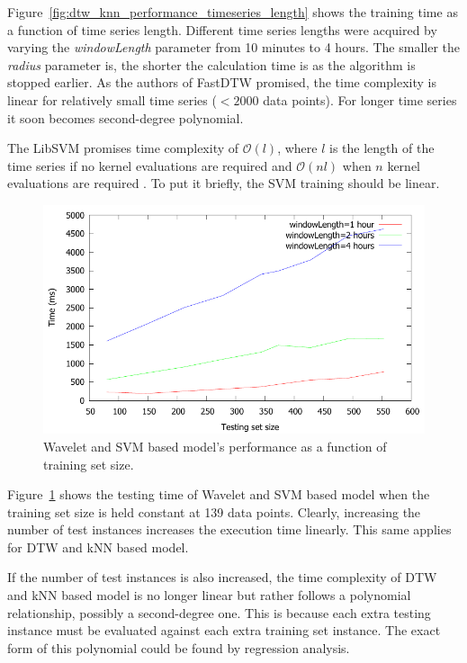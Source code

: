 Figure~\ref{fig:dtw_knn_performance_timeseries_length} shows the training time as a function of time series length. Different time series lengths were acquired by varying the \emph{windowLength} parameter from 10 minutes to 4 hours. The smaller the \emph{radius} parameter is, the shorter the calculation time is as the algorithm is stopped earlier. As the authors of FastDTW promised, the time complexity is linear for relatively small time series ($< 2000$ data points). For longer time series it soon becomes second-degree polynomial. \cite{salvador04}




The LibSVM promises time complexity of $\mathcal{O}(l)$, where $l$ is the length of the time series if no kernel evaluations are required and $\mathcal{O}(nl)$ when $n$ kernel evaluations are required \cite{libsvm}. To put it briefly, the SVM training should be linear. 

\begin{center}
\begin{figure}[h!]
\includegraphics[scale=0.7]{images/wavelet_svm_performance.pdf}
\caption{Wavelet and SVM based model's performance as a function of training set size.}
\label{fig:wavelet_svm_performance}
\end{figure}
\end{center}

Figure~\ref{fig:wavelet_svm_performance} shows the testing time of Wavelet and SVM based model when the training set size is held constant at 139 data points. Clearly, increasing the number of test instances increases the execution time linearly. This same applies for DTW and kNN based model. 

If the number of test instances is also increased, the time complexity of DTW and kNN based model is no longer linear but rather follows a polynomial relationship, possibly a second-degree one. This is because each extra testing instance must be evaluated against each extra training set instance. The exact form of this polynomial could be found by regression analysis.

